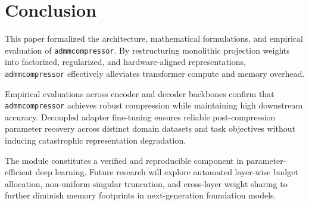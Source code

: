 \section{Conclusion}
This paper formalized the architecture, mathematical formulations, and empirical evaluation of \texttt{admmcompressor}. By restructuring monolithic projection weights into factorized, regularized, and hardware-aligned representations, \texttt{admmcompressor} effectively alleviates transformer compute and memory overhead.

Empirical evaluations across encoder and decoder backbones confirm that \texttt{admmcompressor} achieves robust compression while maintaining high downstream accuracy. Decoupled adapter fine-tuning ensures reliable post-compression parameter recovery across distinct domain datasets and task objectives without inducing catastrophic representation degradation.

The module constitutes a verified and reproducible component in parameter-efficient deep learning. Future research will explore automated layer-wise budget allocation, non-uniform singular truncation, and cross-layer weight sharing to further diminish memory footprints in next-generation foundation models.
